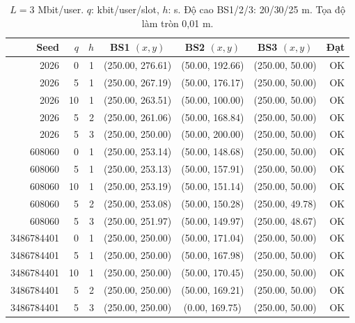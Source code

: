 \begin{table}
\centering
\renewcommand{\arraystretch}{1.16}
\setlength{\tabcolsep}{5pt}
\begin{tabular}{rrrcccr}
\toprule
Seed & $q$ & $h$ & BS1 $(x,y)$ & BS2 $(x,y)$ & BS3 $(x,y)$ & Đạt \\
\midrule
2026 & 0 & 1 & (250.00, 276.61) & (50.00, 192.66) & (250.00, 50.00) & OK \\
2026 & 5 & 1 & (250.00, 267.19) & (50.00, 176.17) & (250.00, 50.00) & OK \\
2026 & 10 & 1 & (250.00, 263.51) & (50.00, 100.00) & (250.00, 50.00) & OK \\
2026 & 5 & 2 & (250.00, 261.06) & (50.00, 168.84) & (250.00, 50.00) & OK \\
2026 & 5 & 3 & (250.00, 250.00) & (50.00, 200.00) & (250.00, 50.00) & OK \\
608060 & 0 & 1 & (250.00, 253.14) & (50.00, 148.68) & (250.00, 50.00) & OK \\
608060 & 5 & 1 & (250.00, 253.13) & (50.00, 157.91) & (250.00, 50.00) & OK \\
608060 & 10 & 1 & (250.00, 253.19) & (50.00, 151.14) & (250.00, 50.00) & OK \\
608060 & 5 & 2 & (250.00, 253.08) & (50.00, 150.28) & (250.00, 49.78) & OK \\
608060 & 5 & 3 & (250.00, 251.97) & (50.00, 149.97) & (250.00, 48.67) & OK \\
3486784401 & 0 & 1 & (250.00, 250.00) & (50.00, 171.04) & (250.00, 50.00) & OK \\
3486784401 & 5 & 1 & (250.00, 250.00) & (50.00, 167.98) & (250.00, 50.00) & OK \\
3486784401 & 10 & 1 & (250.00, 250.00) & (50.00, 170.45) & (250.00, 50.00) & OK \\
3486784401 & 5 & 2 & (250.00, 250.00) & (50.00, 169.21) & (250.00, 50.00) & OK \\
3486784401 & 5 & 3 & (250.00, 250.00) & (0.00, 169.75) & (250.00, 50.00) & OK \\
\bottomrule
\end{tabular}
\caption{$L=3$ Mbit/user. $q$: kbit/user/slot, $h$: s. Độ cao BS1/2/3: 20/30/25 m. Tọa độ làm tròn 0,01 m.}
\end{table}
